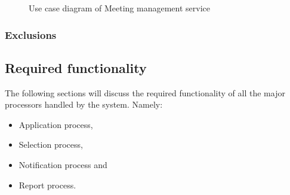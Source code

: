 \documentclass[12pt]{article}
\begin{document}
			\begin{figure}[H]
				\centering				
				\caption{Use case diagram of Meeting management service}
			\end{figure}
		
		\vspace{0.2in}
		\subsubsection{Exclusions}
		\vspace{0.2in}
		
		\vspace{0.2in}
		
		\subsection{Required functionality} %
		\vspace{0.2in}
		The following sections will discuss the required functionality of all the major processors handled by the system. Namely:
		\begin{itemize}
			\item Application process,
			\item Selection process,
			\item Notification process and
			\item Report process.
		\end{itemize}
\end{document}

